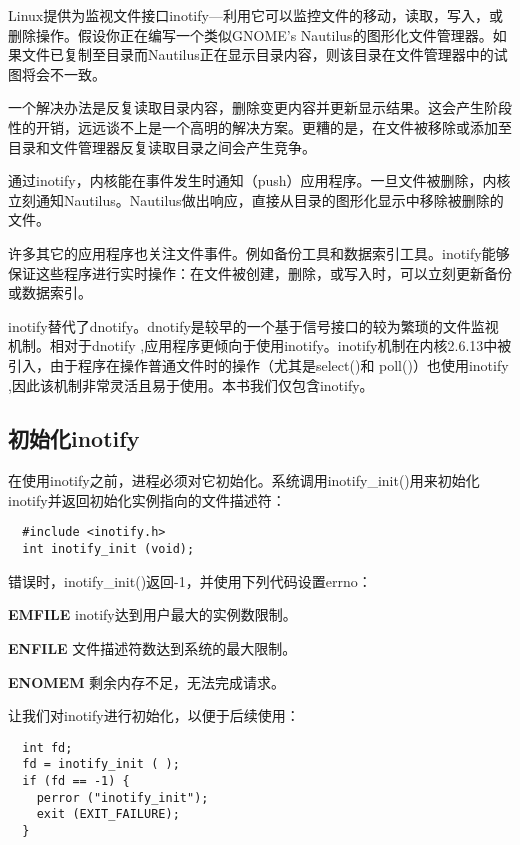 Linux提供为监视文件接口inotify—利用它可以监控文件的移动，读取，写入，或删除操作。假设你正在编写一个类似GNOME’s Nautilus的图形化文件管理器。如果文件已复制至目录而Nautilus正在显示目录内容，则该目录在文件管理器中的试图将会不一致。

一个解决办法是反复读取目录内容，删除变更内容并更新显示结果。这会产生阶段性的开销，远远谈不上是一个高明的解决方案。更糟的是，在文件被移除或添加至目录和文件管理器反复读取目录之间会产生竞争。

通过inotify，内核能在事件发生时通知（push）应用程序。一旦文件被删除，内核立刻通知Nautilus。Nautilus做出响应，直接从目录的图形化显示中移除被删除的文件。

许多其它的应用程序也关注文件事件。例如备份工具和数据索引工具。inotify能够保证这些程序进行实时操作：在文件被创建，删除，或写入时，可以立刻更新备份或数据索引。

inotify替代了dnotify。dnotify是较早的一个基于信号接口的较为繁琐的文件监视机制。相对于dnotify ,应用程序更倾向于使用inotify。inotify机制在内核2.6.13中被引入，由于程序在操作普通文件时的操作（尤其是select()和 poll()）也使用inotify ,因此该机制非常灵活且易于使用。本书我们仅包含inotify。 

\subsection{初始化inotify}

在使用inotify之前，进程必须对它初始化。系统调用inotify\_init()用来初始化inotify并返回初始化实例指向的文件描述符：

\begin{lstlisting}
  #include <inotify.h>
  int inotify_init (void);
\end{lstlisting}

错误时，inotify\_init()返回-1，并使用下列代码设置errno：

\begin{eqlist*}
\item[\textbf{EMFILE}] inotify达到用户最大的实例数限制。
\item[\textbf{ENFILE}] 文件描述符数达到系统的最大限制。
\item[\textbf{ENOMEM}] 剩余内存不足，无法完成请求。
\end{eqlist*}

让我们对inotify进行初始化，以便于后续使用：

\begin{lstlisting}
  int fd;
  fd = inotify_init ( );
  if (fd == -1) {
    perror ("inotify_init");
    exit (EXIT_FAILURE);
  }
\end{lstlisting}

